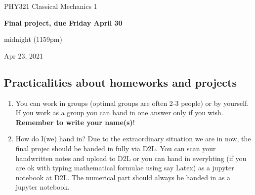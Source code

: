 \documentclass[%
oneside,                 %
final,                   %
10pt]{article}
\begin{document}

\newcommand{\exercisesection}[1]{\subsection*{#1}}






\thispagestyle{empty}

\begin{center}
{\LARGE\bf
\begin{spacing}{1.25}
PHY321 Classical Mechanics 1
\end{spacing}
}
\end{center}


\begin{center}
{\bf Final  project, due Friday April 30}
\end{center}

    \begin{center}
\centerline{{\small midnight (1159pm)}}
\end{center}
    

\begin{center}
Apr 23, 2021
\end{center}

\vspace{1cm}


\subsection*{Practicalities about  homeworks and projects}

\begin{enumerate}
\item You can work in groups (optimal groups are often 2-3 people) or by yourself. If you work as a group you can hand in one answer only if you wish. \textbf{Remember to write your name(s)}!

\item How do I(we)  hand in?  Due to the extraordinary situation we are in now, the final projec should be handed in fully via D2L. You can scan your handwritten notes and upload to D2L or you can hand in everyhting (if you are ok with typing mathematical formulae using say Latex) as a jupyter notebook at D2L. The numerical part should always be handed in as a jupyter notebook.
\end{enumerate}
\end{document}
